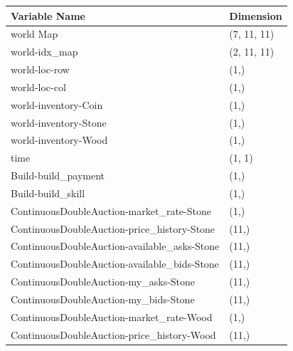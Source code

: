 \begin{table}[]
    \centering
    \begin{tabular}{ll}
    \hline
    Variable Name                                 & Dimension                   \\ \hline
    world Map                                     & (7, 11, 11)                    \\ 
    world-idx\_map                                & (2, 11, 11)               \\ 
    world-loc-row                                 & (1,)                         \\ 
    world-loc-col                                 & (1,)                         \\ 
    world-inventory-Coin                          & (1,)                         \\ 
    world-inventory-Stone                         & (1,)                                    \\ 
    world-inventory-Wood                          & (1,)                                    \\ 
    time                                          & (1, 1)                                   \\ 
    Build-build\_payment                          & (1,)                                     \\ 
    Build-build\_skill                            & (1,)                                     \\ 
    ContinuousDoubleAuction-market\_rate-Stone    & (1,)                                     \\ 
    ContinuousDoubleAuction-price\_history-Stone  & (11,)                                    \\ 
    ContinuousDoubleAuction-available\_asks-Stone & (11,)                                    \\ 
    ContinuousDoubleAuction-available\_bids-Stone & (11,)                                    \\ 
    ContinuousDoubleAuction-my\_asks-Stone        & (11,)                                    \\ 
    ContinuousDoubleAuction-my\_bids-Stone        & (11,)                                    \\ 
    ContinuousDoubleAuction-market\_rate-Wood     & (1,)                                     \\ 
    ContinuousDoubleAuction-price\_history-Wood   & (11,)                                    \\ 

\end{tabular}
\end{table}
